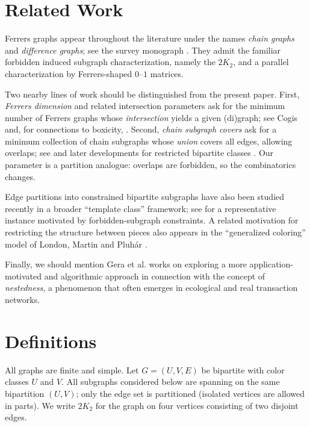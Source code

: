\documentclass[12pt]{amsart}
\begin{document}
\section{Related Work}
\label{sec:related}

Ferrers graphs appear throughout the literature under the names \emph{chain graphs} and \emph{difference graphs}; see the survey monograph \cite{BrandstadtLeSpinrad}.
They admit the familiar forbidden induced subgraph characterization, namely the $2K_2$, and a parallel characterization by Ferrers-shaped $0$--$1$ matrices.

Two nearby lines of work should be distinguished from the present paper.
First, \emph{Ferrers dimension} and related intersection parameters ask for the minimum number of Ferrers graphs whose \emph{intersection} yields a given (di)graph; see Cogis \cite{Cogis} and, for connections to boxicity, \cite{ChatterjeeGhosh}.
Second, \emph{chain subgraph covers} ask for a minimum collection of chain subgraphs whose \emph{union} covers all edges, allowing overlaps; see \cite{MaSpinrad} and later developments for restricted bipartite classes \cite{BrandstadtES}.
Our parameter is a partition analogue: overlaps are forbidden, so the combinatorics changes.


Edge partitions into constrained bipartite subgraphs have also been studied recently in a broader ``template class'' framework; see \cite{GyorffyLondonNagyPluhar2025} for a representative instance motivated by forbidden-subgraph constraints. A related motivation for restricting the structure between pieces also appears in the ``generalized coloring'' model of London, Martin and Pluh\'ar  \cite{LondonMartinPluhar2022}.

Finally, we should mention Gera et al. works \cite{GeraLondonPluhar2022, GeraLondon2023} on exploring a more application-motivated and algorithmic approach in connection with the concept of \emph{nestedness}, a phenomenon that often emerges in ecological and real transaction networks.


\section{Definitions}

All graphs are finite and simple. Let $G=(U,V,E)$ be bipartite with color classes $U$ and $V$. All subgraphs considered below are spanning on the same bipartition $(U,V)$; only the edge set is partitioned (isolated vertices are allowed in parts).
We write $2K_2$ for the graph on four vertices consisting of two disjoint edges.
\end{document}
